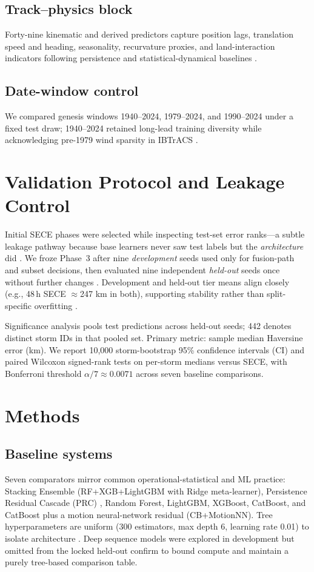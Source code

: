 \documentclass[conference]{IEEEtran}
\newcommand{\sece}{SECE}
\newcommand{\ibtracs}{IBTrACS}
\newcommand{\km}{\,km}
\newcommand{\npooledstorms}{442}
\newcommand{\bonf}{0.0071}
\begin{document}
\subsection{Track--physics block}
Forty-nine kinematic and derived predictors capture position lags, translation speed and heading, seasonality, recurvature proxies, and land-interaction indicators following persistence and statistical-dynamical baselines \cite{neumann1972,kaplan2003,demaria2013,holland1983}.

\subsection{Date-window control}
We compared genesis windows 1940--2024, 1979--2024, and 1990--2024 under a fixed test draw; 1940--2024 retained long-lead training diversity while acknowledging pre-1979 wind sparsity in \ibtracs{} \cite{kossin2013,walsh2015}.

\section{Validation Protocol and Leakage Control}
Initial \sece{} phases were selected while inspecting test-set error ranks---a subtle leakage pathway because base learners never saw test labels but the \emph{architecture} did \cite{cawley2010,kaplan2015}.
We froze Phase~3 after nine \emph{development} seeds used only for fusion-path and subset decisions, then evaluated nine independent \emph{held-out} seeds once without further changes \cite{cawley2010}.
Development and held-out tier means align closely (e.g., 48\,h \sece{} $\approx$247\,\km{} in both), supporting stability rather than split-specific overfitting \cite{ritchie2014,gneiting2014}.

Significance analysis pools test predictions across held-out seeds; \npooledstorms{} denotes distinct storm IDs in that pooled set.
Primary metric: sample median Haversine error (km).
We report 10{,}000 storm-bootstrap 95\% confidence intervals (CI) and paired Wilcoxon signed-rank tests on per-storm medians versus \sece{}, with Bonferroni threshold $\alpha/7 \approx \bonf$ across seven baseline comparisons.

\section{Methods}
\subsection{Baseline systems}
Seven comparators mirror common operational-statistical and ML practice: Stacking Ensemble (RF+XGB+LightGBM with Ridge meta-learner), Persistence Residual Cascade (PRC) \cite{neumann1972}, Random Forest, LightGBM, XGBoost, CatBoost, and CatBoost plus a motion neural-network residual (CB+MotionNN).
Tree hyperparameters are uniform (300 estimators, max depth 6, learning rate 0.01) to isolate architecture \cite{grinsztajn2022,probst2019}.
Deep sequence models were explored in development but omitted from the locked held-out confirm to bound compute and maintain a purely tree-based comparison table.
\end{document}
